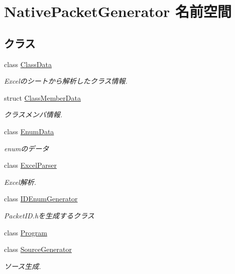 \hypertarget{namespaceNativePacketGenerator}{}\section{Native\+Packet\+Generator 名前空間}
\label{namespaceNativePacketGenerator}
\subsection*{クラス}
\begin{DoxyCompactItemize}
\item 
class \mbox{\hyperlink{classNativePacketGenerator_1_1ClassData}{Class\+Data}}
\begin{DoxyCompactList}\small\item\em Excelのシートから解析したクラス情報. \end{DoxyCompactList}\item 
struct \mbox{\hyperlink{structNativePacketGenerator_1_1ClassMemberData}{Class\+Member\+Data}}
\begin{DoxyCompactList}\small\item\em クラスメンバ情報. \end{DoxyCompactList}\item 
class \mbox{\hyperlink{classNativePacketGenerator_1_1EnumData}{Enum\+Data}}
\begin{DoxyCompactList}\small\item\em enumのデータ \end{DoxyCompactList}\item 
class \mbox{\hyperlink{classNativePacketGenerator_1_1ExcelParser}{Excel\+Parser}}
\begin{DoxyCompactList}\small\item\em Excel解析. \end{DoxyCompactList}\item 
class \mbox{\hyperlink{classNativePacketGenerator_1_1IDEnumGenerator}{I\+D\+Enum\+Generator}}
\begin{DoxyCompactList}\small\item\em Packet\+I\+D.\+hを生成するクラス \end{DoxyCompactList}\item 
class \mbox{\hyperlink{classNativePacketGenerator_1_1Program}{Program}}
\item 
class \mbox{\hyperlink{classNativePacketGenerator_1_1SourceGenerator}{Source\+Generator}}
\begin{DoxyCompactList}\small\item\em ソース生成. \end{DoxyCompactList}\end{DoxyCompactItemize}

